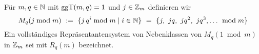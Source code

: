 
\begin{definition}
  Für $m,q\in\mathbb{N}$ mit $\operatorname{ggT}(m,q) = 1$ und $j \in \mathbb{Z}_m$ definieren wir
  \[ M_q(j\bmod m) \ :=\  \{ j\,q^i \bmod m\mid i\in\mathbb{N}\} \ =\  
    \{j,\ jq,\ jq^2,\ jq^3,\ldots\ \bmod m\}\]
  Ein vollständiges Repräsentantensystem von Nebenklassen von $M_q(1\bmod m)$
  in $\mathbb{Z}_m$ sei mit $R_q(m)$ bezeichnet.
\end{definition}


